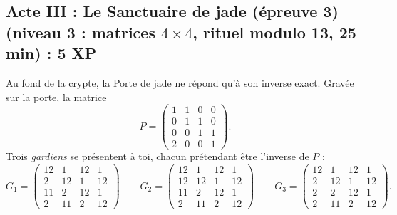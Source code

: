 \documentclass[11pt,a4paper]{article}
\begin{document}
	\subsection*{\textcolor{jade}{Acte III : Le Sanctuaire de jade (épreuve 3)} \normalsize\textcolor{jade}{(niveau 3 : matrices $4\times 4$, rituel modulo 13, 25 min)} : 5 XP}
	
	Au fond de la crypte, la Porte de jade ne répond qu'à son inverse exact.
	Gravée sur la porte, la matrice
	\[
	P=\begin{pmatrix}
		1&1&0&0\\
		0&1&1&0\\
		0&0&1&1\\
		2&0&0&1
	\end{pmatrix}.
	\]
	Trois \emph{gardiens} se présentent à toi, chacun prétendant être
	l'inverse de $P$ :
	\[
	G_1=\begin{pmatrix}
		12&1&12&1\\
		2&12&1&12\\
		11&2&12&1\\
		2&11&2&12
	\end{pmatrix}\qquad
	G_2=\begin{pmatrix}
		12&1&12&1\\
		12&12&1&12\\
		11&2&12&1\\
		2&11&2&12
	\end{pmatrix}\qquad
	G_3=\begin{pmatrix}
		12&1&12&1\\
		2&12&1&12\\
		2&2&12&1\\
		2&11&2&12
	\end{pmatrix}.
	\]
	
\end{document}
